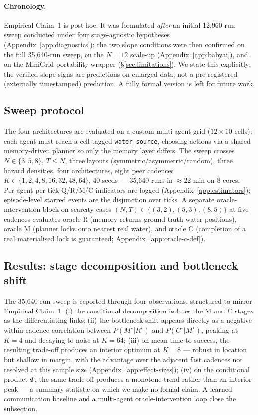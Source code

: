 \documentclass{article}
\begin{document}
\paragraph{Chronology.}
Empirical Claim~1 is post-hoc. It was formulated \emph{after} an initial 12{,}960-run sweep conducted under four stage-agnostic hypotheses (Appendix~\ref{app:diagnostics}); the two slope conditions were then confirmed on the full 35{,}640-run sweep, on the $N\!=\!12$ scale-up (Appendix~\ref{app:babyai}), and on the MiniGrid portability wrapper (\S\ref{sec:limitations}). We state this explicitly: the verified slope signs are predictions on enlarged data, not a pre-registered (externally timestamped)
prediction. A fully formal version is left for future work.

\subsection{Sweep protocol}
\label{sec:multi-agent-protocol}

The four architectures are evaluated on a custom multi-agent grid ($12{\times}10$ cells); each agent must reach a cell tagged \texttt{water\_source}, choosing actions via a shared memory-driven planner so only the memory layer differs. The sweep crosses $N{\in}\{3,5,8\}$, $T{\le}N$, three layouts (symmetric/asymmetric/random), three hazard densities, four architectures, eight peer cadences $K{\in}\{1,2,4,8,16,32,48,64\}$, 40 seeds --- 35{,}640 runs in $\approx 22$ min on 8 cores. Per-agent per-tick Q/R/M/C indicators are logged (Appendix~\ref{app:estimators}); episode-level starred events are the disjunction over ticks. A separate oracle-intervention block on scarcity cases $(N,T){\in}\{(3,2),(5,3),(8,5)\}$ at five cadences evaluates oracle R (memory returns ground-truth water positions), oracle M (planner locks onto nearest real water), and oracle C (completion of a real materialised lock is guaranteed; Appendix~\ref{app:oracle-c-def}).

\subsection{Results: stage decomposition and bottleneck shift}
\label{sec:multi-agent-results}

The 35{,}640-run sweep is reported through four observations,
structured to mirror Empirical Claim~1: (i) the conditional
decomposition isolates the M and C stages as the differentiating
links; (ii) the bottleneck shift appears directly as a negative
within-cadence correlation between $P(M^\star|R^\star)$ and
$P(C^\star|M^\star)$, peaking at $K\!=\!4$ and decaying to noise at
$K\!=\!64$; (iii) on mean time-to-success, the resulting trade-off
produces an interior optimum at $K\!=\!8$ --- robust in location but shallow in margin, with the advantage over the adjacent fast cadences not resolved at this sample size (Appendix~\ref{app:effect-sizes}); (iv) on the
conditional product $\Phi$, the same trade-off produces a monotone
trend rather than an interior peak --- a summary statistic on which we make no formal claim. A learned-communication baseline and a multi-agent
oracle-intervention loop close the subsection.
\end{document}

